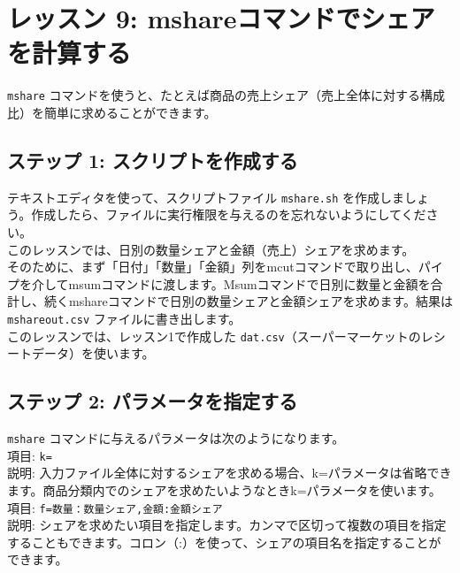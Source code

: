 

%

\section{レッスン 9: mshareコマンドでシェアを計算する}

\verb|mshare| コマンドを使うと、たとえば商品の売上シェア（売上全体に対する構成比）を簡単に求めることができます。

\subsection{ステップ 1: スクリプトを作成する}

テキストエディタを使って、スクリプトファイル \verb|mshare.sh| を作成しましょう。作成したら、ファイルに実行権限を与えるのを忘れないようにしてください。\\

このレッスンでは、日別の数量シェアと金額（売上）シェアを求めます。\\

そのために、まず「日付」「数量」「金額」列をmcutコマンドで取り出し、パイプを介してmsumコマンドに渡します。Msumコマンドで日別に数量と金額を合計し、続くmshareコマンドで日別の数量シェアと金額シェアを求めます。結果は \verb|mshareout.csv| ファイルに書き出します。\\

このレッスンでは、レッスン1で作成した \verb|dat.csv|（スーパーマーケットのレシートデータ）を使います。

\subsection{ステップ 2: パラメータを指定する}

{\setlength{\parindent}{0cm}

\verb|mshare| コマンドに与えるパラメータは次のようになります。\\

項目: 		\verb|k=| \\
説明: 入力ファイル全体に対するシェアを求める場合、k=パラメータは省略できます。商品分類内でのシェアを求めたいようなときk=パラメータを使います。\\

項目: \verb|f=数量：数量シェア,金額:金額シェア| \\
説明: シェアを求めたい項目を指定します。カンマで区切って複数の項目を指定することもできます。コロン（:）を使って、シェアの項目名を指定することができます。
}

